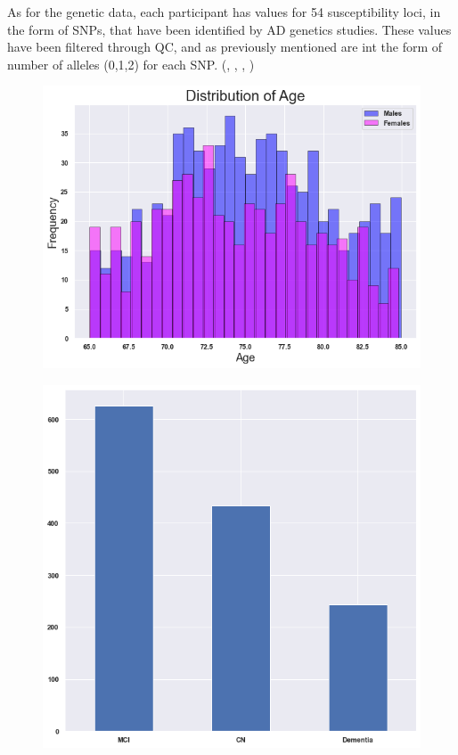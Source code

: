 {As for the genetic data, each participant has values for 54 susceptibility loci, in the form of SNPs, that have been identified by AD genetics studies. These values have been filtered through QC, and as previously mentioned are int the form of number of alleles (0,1,2) for each SNP. (\cite{72}, \cite{73}, \cite{74}, \cite{75})
\begin{figure}
  \centering
  \includegraphics[width=.7\linewidth]{figures/Methodology/sex_histogram.png}
  \caption{}
\end{figure}%
\begin{figure}
  \centering
  \includegraphics[width=.7\linewidth]{figures/Methodology/classes_bars.png}
  \caption{}
\end{figure}
\bigbreak
}
